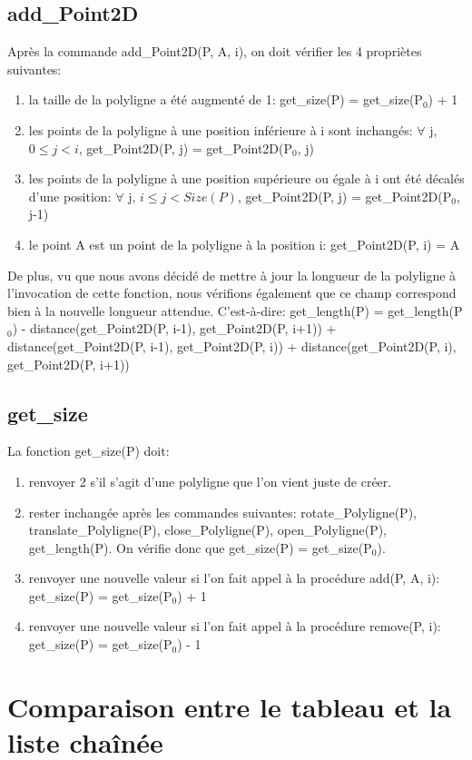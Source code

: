 \documentclass[a4paper, 11pt, oneside]{article}
\begin{document}
\subsection{add\_Point2D}
Après la commande add\_Point2D(P, A, i), on doit vérifier les 4 propriètes suivantes:
\begin{enumerate}
    \item la taille de la polyligne a été augmenté de 1: get\_size(P) = get\_size(P$_0$) + 1
    \item les points de la polyligne à une position inférieure à i sont inchangés: $\forall$ j, $0\leq j<i$, get\_Point2D(P, j) = get\_Point2D(P$_0$, j)
    \item les points de la polyligne à une position supérieure ou égale à i ont été décalés d'une position: $\forall$ j, $i\leq j<Size(P)$, get\_Point2D(P, j) = get\_Point2D(P$_0$, j-1)
    \item le point A est un point de la polyligne à la position i: get\_Point2D(P, i) = A
\end{enumerate}
De plus, vu que nous avons décidé de mettre à jour la longueur de la polyligne à l'invocation de cette fonction, nous vérifions également que ce champ correspond bien à la nouvelle longueur attendue. C'est-à-dire: get\_length(P) = get\_length(P$_0$) - distance(get\_Point2D(P, i-1), get\_Point2D(P, i+1)) + distance(get\_Point2D(P, i-1), get\_Point2D(P, i)) + distance(get\_Point2D(P, i), get\_Point2D(P, i+1))

\subsection{get\_size}
La fonction get\_size(P) doit:
\begin{enumerate}
    \item renvoyer 2 s'il s'agit d'une polyligne que l'on vient juste de créer.
    \item rester inchangée après les commandes suivantes: rotate\_Polyligne(P), translate\_Polyligne(P), close\_Polyligne(P), open\_Polyligne(P), get\_length(P). On vérifie donc que get\_size(P) = get\_size(P$_0$).
    \item renvoyer une nouvelle valeur si l'on fait appel à la procédure add(P, A, i): get\_size(P) = get\_size(P$_0$) + 1 
    \item renvoyer une nouvelle valeur si l'on fait appel à la procédure remove(P, i): get\_size(P) = get\_size(P$_0$) - 1 
\end{enumerate}

\section{Comparaison entre le tableau et la liste chaînée}
\end{document}
